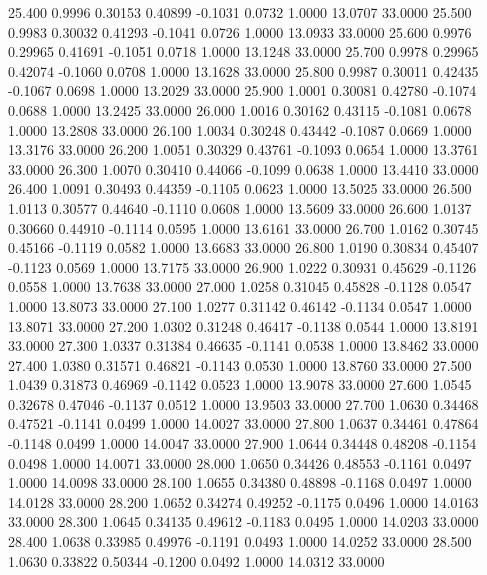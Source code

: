   25.400   0.9996   0.30153   0.40899  -0.1031   0.0732   1.0000  13.0707  33.0000
  25.500   0.9983   0.30032   0.41293  -0.1041   0.0726   1.0000  13.0933  33.0000
  25.600   0.9976   0.29965   0.41691  -0.1051   0.0718   1.0000  13.1248  33.0000
  25.700   0.9978   0.29965   0.42074  -0.1060   0.0708   1.0000  13.1628  33.0000
  25.800   0.9987   0.30011   0.42435  -0.1067   0.0698   1.0000  13.2029  33.0000
  25.900   1.0001   0.30081   0.42780  -0.1074   0.0688   1.0000  13.2425  33.0000
  26.000   1.0016   0.30162   0.43115  -0.1081   0.0678   1.0000  13.2808  33.0000
  26.100   1.0034   0.30248   0.43442  -0.1087   0.0669   1.0000  13.3176  33.0000
  26.200   1.0051   0.30329   0.43761  -0.1093   0.0654   1.0000  13.3761  33.0000
  26.300   1.0070   0.30410   0.44066  -0.1099   0.0638   1.0000  13.4410  33.0000
  26.400   1.0091   0.30493   0.44359  -0.1105   0.0623   1.0000  13.5025  33.0000
  26.500   1.0113   0.30577   0.44640  -0.1110   0.0608   1.0000  13.5609  33.0000
  26.600   1.0137   0.30660   0.44910  -0.1114   0.0595   1.0000  13.6161  33.0000
  26.700   1.0162   0.30745   0.45166  -0.1119   0.0582   1.0000  13.6683  33.0000
  26.800   1.0190   0.30834   0.45407  -0.1123   0.0569   1.0000  13.7175  33.0000
  26.900   1.0222   0.30931   0.45629  -0.1126   0.0558   1.0000  13.7638  33.0000
  27.000   1.0258   0.31045   0.45828  -0.1128   0.0547   1.0000  13.8073  33.0000
  27.100   1.0277   0.31142   0.46142  -0.1134   0.0547   1.0000  13.8071  33.0000
  27.200   1.0302   0.31248   0.46417  -0.1138   0.0544   1.0000  13.8191  33.0000
  27.300   1.0337   0.31384   0.46635  -0.1141   0.0538   1.0000  13.8462  33.0000
  27.400   1.0380   0.31571   0.46821  -0.1143   0.0530   1.0000  13.8760  33.0000
  27.500   1.0439   0.31873   0.46969  -0.1142   0.0523   1.0000  13.9078  33.0000
  27.600   1.0545   0.32678   0.47046  -0.1137   0.0512   1.0000  13.9503  33.0000
  27.700   1.0630   0.34468   0.47521  -0.1141   0.0499   1.0000  14.0027  33.0000
  27.800   1.0637   0.34461   0.47864  -0.1148   0.0499   1.0000  14.0047  33.0000
  27.900   1.0644   0.34448   0.48208  -0.1154   0.0498   1.0000  14.0071  33.0000
  28.000   1.0650   0.34426   0.48553  -0.1161   0.0497   1.0000  14.0098  33.0000
  28.100   1.0655   0.34380   0.48898  -0.1168   0.0497   1.0000  14.0128  33.0000
  28.200   1.0652   0.34274   0.49252  -0.1175   0.0496   1.0000  14.0163  33.0000
  28.300   1.0645   0.34135   0.49612  -0.1183   0.0495   1.0000  14.0203  33.0000
  28.400   1.0638   0.33985   0.49976  -0.1191   0.0493   1.0000  14.0252  33.0000
  28.500   1.0630   0.33822   0.50344  -0.1200   0.0492   1.0000  14.0312  33.0000
